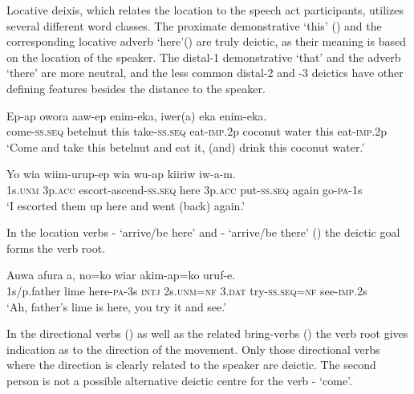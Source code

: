 Locative deixis, which relates the location to the speech act participants, utilizes several different word classes. The proximate demonstrative  `this' () and the corresponding locative adverb  `here'()  are truly deictic, as their meaning is based on the location of the speaker. The distal-1 demonstrative  `that' and the adverb  `there' are more neutral, and the less common distal-2 and -3 deictics have other defining features besides the distance to the speaker. 

\ea%
\label{ex:6:x1273}
\gll Ep-ap  owora    aaw-ep  enim-eka,  iwer(a)  eka   enim-eka. \\
come-\textsc{ss}.\textsc{seq}  betelnut  this  take-\textsc{ss}.\textsc{seq}  eat-\textsc{imp}.2p  coconut  water this  eat-\textsc{imp}.2p\\
\glt `Come and take this betelnut and eat it, (and) drink this coconut water.'
\z

\ea%
\label{ex:6:x1274}
\gll Yo  wia  wiim-urup-ep    wia  wu-ap kiiriw  iw-a-m.\\
1s.\textsc{unm}  3p.\textsc{acc}  escort-ascend-\textsc{ss}.\textsc{seq}  here  3p.\textsc{acc}  put-\textsc{ss}.\textsc{seq} again  go-\textsc{pa}-1s\\
\glt `I escorted them up here and went (back) again.'
\z

In the location verbs - `arrive/be here' and - `arrive/be there' () the deictic goal forms the verb root. 

\ea%
\label{ex:6:x1275}
\gll Auwa  afura    a,  no=ko  wiar akim-ap=ko  uruf-e.\\
1s/p.father  lime  here-\textsc{pa}-3s  \textsc{intj}  2s.\textsc{unm}=\textsc{nf}  3.\textsc{dat} try-\textsc{ss}.\textsc{seq}=\textsc{nf}  see-\textsc{imp}.2s\\
\glt `Ah, father's lime is here, you try it and see.'
\z

In the directional verbs () as well as the related bring-verbs () the verb root gives indication as to the direction of the movement. Only those directional verbs where the direction is clearly related to the speaker are deictic. The second person is not a possible alternative deictic centre for the verb - `come'.  

